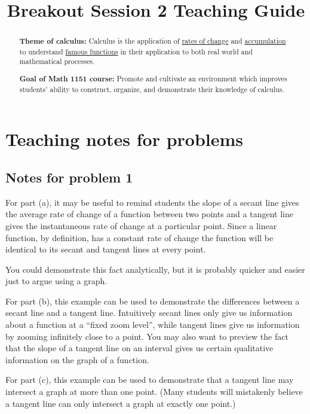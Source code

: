 \documentclass[handout, nooutcomes]{ximera}
\title{Breakout Session 2 Teaching Guide}
\begin{document}
\begin{abstract}
 \textbf{Theme of calculus:} Calculus is the application of  \href{https://en.wikipedia.org/wiki/Derivative}{rates of change} and \href{https://en.wikipedia.org/wiki/Integral}{accumulation} to understand \href{https://en.wikipedia.org/wiki/Elementary_function}{famous functions} in their application to both real world and mathematical processes.

  \textbf{Goal of Math 1151 course:} Promote and cultivate an environment which improves students' ability to construct, organize, and demonstrate their knowledge of calculus.
\end{abstract}
\maketitle

\section{Teaching notes for problems}
\subsection*{Notes for problem 1}
For part (a), it may be useful to remind students the slope of a secant line gives the average rate of change of a function between two points and a tangent line gives the instantaneous rate of change at a particular point.
Since a linear function, by definition, has a constant rate of change the function will be identical to its secant and tangent lines at every point.

You could demonstrate this fact analytically, but it is probably quicker and easier just to argue using a graph.

For part (b), this example can be used to demonstrate the differences between a secant line and a tangent line.
Intuitively secant lines only give us information about a function at a ``fixed zoom level'', while tangent lines give us information by zooming infinitely close to a point.
You may also want to preview the fact that the slope of a tangent line on an interval gives us certain qualitative information on the graph of a function.

For part (c), this example can be used to demonstrate that a tangent line may intersect a graph at more than one point.
(Many students will mistakenly believe a tangent line can only intersect a graph at exactly one point.)
        
\end{document}
